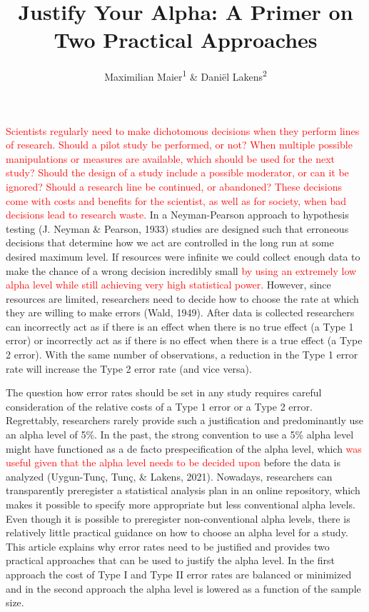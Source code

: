 \documentclass[
  english,
  ,man, a4paper,floatsintext]{apa6}
\title{Justify Your Alpha: A Primer on Two Practical Approaches}
\author{Maximilian Maier\textsuperscript{1} \& Daniël Lakens\textsuperscript{2}}
\date{}
\affiliation{\vspace{0.5cm}\textsuperscript{1} University of Amsterdam, The Netherlands\\\textsuperscript{2} Eindhoven University of Technology, The Netherlands}
\begin{document}
\maketitle

\textcolor{red}{Scientists regularly need to make dichotomous decisions when they perform lines of research. Should a pilot study be performed, or not? When multiple possible manipulations or measures are available, which should be used for the next study? Should the design of a study include a possible moderator, or can it be ignored? Should a research line be continued, or abandoned? These decisions come with costs and benefits for the scientist, as well as for society, when bad decisions lead to research waste.} In a Neyman-Pearson approach to hypothesis testing (J. Neyman \& Pearson, 1933) studies are designed such that erroneous decisions that determine how we act are controlled in the long run at some desired maximum level. If resources were infinite we could collect enough data to make the chance of a wrong decision incredibly small \textcolor{red}{by using an extremely low alpha level while still achieving very high statistical power.} However, since resources are limited, researchers need to decide how to choose the rate at which they are willing to make errors (Wald, 1949). After data is collected researchers can incorrectly act as if there is an effect when there is no true effect (a Type 1 error) or incorrectly act as if there is no effect when there is a true effect (a Type 2 error). With the same number of observations, a reduction in the Type 1 error rate will increase the Type 2 error rate (and vice versa).

The question how error rates should be set in any study requires careful consideration of the relative costs of a Type 1 error or a Type 2 error. Regrettably, researchers rarely provide such a justification and predominantly use an alpha level of 5\%. In the past, the strong convention to use a 5\% alpha level might have functioned as a de facto prespecification of the alpha level, which \textcolor{red}{was useful given that the alpha level needs to be decided upon} before the data is analyzed (Uygun-Tunç, Tunç, \& Lakens, 2021). Nowadays, researchers can transparently preregister a statistical analysis plan in an online repository, which makes it possible to specify more appropriate but less conventional alpha levels. Even though it is possible to preregister non-conventional alpha levels, there is relatively little practical guidance on how to choose an alpha level for a study. This article explains why error rates need to be justified and provides two practical approaches that can be used to justify the alpha level. In the first approach the cost of Type I and Type II error rates are balanced or minimized and in the second approach the alpha level is lowered as a function of the sample size.
\end{document}
